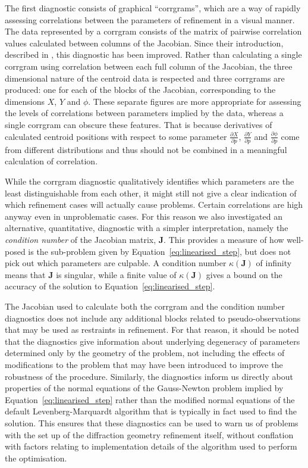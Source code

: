 \documentclass[preprint]{iucr}
\newcommand{\mat}[1]{\mathbf{#1}}
\newcommand{\pder}[2][]{\frac{\partial#1}{\partial#2}}
\begin{document}
The first diagnostic consists of graphical ``corrgrams'', which are a way of
rapidly assessing correlations between the parameters of refinement in a visual
manner. The data represented by a corrgram consists of the matrix of pairwise
correlation values calculated between columns of the Jacobian. Since their
introduction, described in , this diagnostic has been
improved. Rather than calculating a single corrgram using correlation between
each full column of the Jacobian, the three dimensional nature of the centroid
data is respected and three corrgrams are produced: one for each of the blocks
of the Jacobian, corresponding to the dimensions $X$, $Y$ and $\phi$. These
separate figures are more appropriate for assessing the levels of correlations
between parameters implied by the data, whereas a single corrgram can obscure
these features. That is because derivatives of calculated centroid positions
with respect to some parameter $\pder[X]{p}$, $\pder[Y]{p}$ and
$\pder[\phi]{p}$ come from different distributions and thus should not be
combined in a meaningful calculation of correlation.

While the corrgram diagnostic qualitatively identifies which parameters are the
least distinguishable from each other, it might still not give a clear
indication of which refinement cases will actually cause problems. Certain
correlations are high anyway even in unproblematic cases. For this reason we
also investigated an alternative, quantitative, diagnostic with a simpler
interpretation, namely the \emph{condition number} of the Jacobian matrix,
$\mat{J}$. This provides a measure of how well-posed is the sub-problem given
by Equation~\ref{eq:linearised_step}, but does not pick out which parameters
are culpable. A condition number $\kappa \left( \mat{J} \right)$ of infinity
means that $\mat{J}$ is singular, while a finite value of $\kappa \left(
\mat{J} \right)$ gives a bound on the accuracy of the solution to
Equation~\ref{eq:linearised_step}.

The Jacobian used to calculate both the corrgram and the condition number
diagnostics does not include any additional blocks related to
pseudo-observations that may be used as restraints in refinement. For that
reason, it should be noted that the diagnostics give information about
underlying degeneracy of parameters determined only by the geometry of the
problem, not including the effects of modifications to the problem that may
have been introduced to improve the robustness of the procedure. Similarly, the
diagnostics inform us directly about properties of the normal equations of the
Gauss-Newton problem implied by Equation~\ref{eq:linearised_step} rather than
the modified normal equations of the default Levenberg-Marquardt algorithm that
is typically in fact used to find the solution. This ensures that these
diagnostics can be used to warn us of problems with the set up of the
diffraction geometry refinement itself, without conflation with factors
relating to implementation details of the algorithm used to perform the
optimisation.
\end{document}

